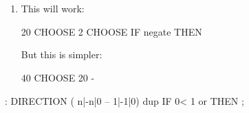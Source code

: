 \section{}
\ifeightyfour\begin{enumerate}
\item This will work:
\begin{Code}
20 CHOOSE  2 CHOOSE  IF negate THEN
\end{Code}
But this is simpler:
\begin{Code}
40 CHOOSE  20 -
\end{Code}
\end{enumerate}\else
\begin{Code}
: DIRECTION  ( n|-n|0 -- 1|-1|0)  dup  IF  0< 1 or  THEN ;
\end{Code}
\fi

